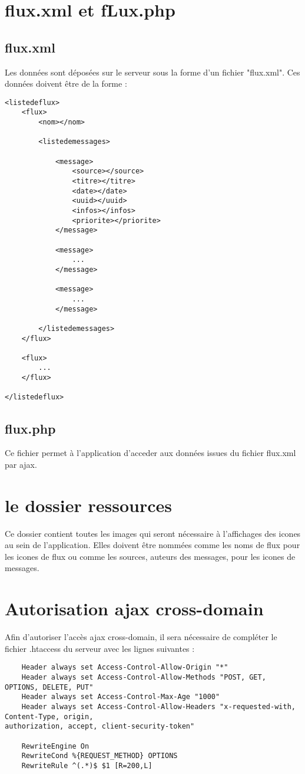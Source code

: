 \documentclass{report}
\begin{document}
\section{flux.xml et fLux.php}

\subsection{flux.xml}
Les données sont déposées sur le serveur sous la forme d'un fichier "flux.xml". Ces données doivent être de la forme :

\begin{verbatim}
<listedeflux>
	<flux>
		<nom></nom>
		
		<listedemessages>
		
			<message>
				<source></source>
				<titre></titre>
				<date></date>
				<uuid></uuid>
				<infos></infos>
				<priorite></priorite>
			</message>
			
			<message>
				...
			</message>

			<message>
				...
			</message>

		</listedemessages>
	</flux>

	<flux>
		...
	</flux>

</listedeflux>
\end{verbatim}

\subsection{flux.php}
Ce fichier permet à l'application d'acceder aux données issues du fichier flux.xml par ajax.

\section{le dossier ressources}
Ce dossier contient toutes les images qui seront nécessaire à l'affichages des icones au sein de l'application. Elles doivent être nommées comme les noms de flux pour les icones de flux ou comme les sources, auteurs des messages, pour les icones de messages.

\section{Autorisation ajax cross-domain}
Afin d'autoriser l'accès ajax cross-domain, il sera nécessaire de compléter le fichier .htaccess du serveur avec les lignes suivantes :

\begin{verbatim}
	Header always set Access-Control-Allow-Origin "*"
	Header always set Access-Control-Allow-Methods "POST, GET, OPTIONS, DELETE, PUT"
	Header always set Access-Control-Max-Age "1000"
	Header always set Access-Control-Allow-Headers "x-requested-with, Content-Type, origin, 
authorization, accept, client-security-token"
	 
	RewriteEngine On
	RewriteCond %{REQUEST_METHOD} OPTIONS
	RewriteRule ^(.*)$ $1 [R=200,L]
\end{verbatim}
\end{document}
